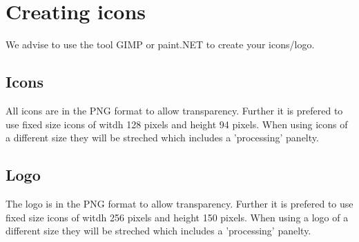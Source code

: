 \chapter{Creating icons}
We advise to use the tool GIMP or paint.NET to create your icons/logo.

\section{Icons}
All icons are in the PNG format to allow transparency. Further it is prefered to use fixed size icons of witdh 128 pixels and height 94 pixels. When using icons of a different size they will be streched which includes a 'processing' panelty.

\section{Logo}
The logo is in the PNG format to allow transparency. Further it is prefered to use fixed size icons of witdh 256 pixels and height 150 pixels. When using a logo of a different size they will be streched which includes a 'processing' panelty.


